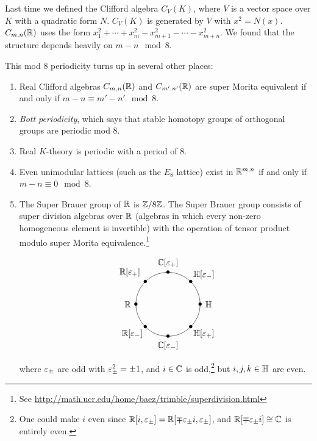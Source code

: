  \setcounter{lecture}{23}

 Last time we defined the Clifford algebra $C_V(K)$, where $V$ is a vector space over $K$
 with a quadratic form $N$. $C_V(K)$ is generated by $V$ with $x^2=N(x)$.
 $C_{m,n}(\mathbb{R})$ uses the form $x_1^2+\cdots + x_m^2-x_{m+1}^2-\cdots - x_{m+n}^2$. We
 found that the structure depends heavily on $m-n \mod 8$.
 \begin{remark}
   This mod 8 periodicity turns up in several other places:
 \begin{enumerate}
 \item Real Clifford algebras $C_{m,n}(\mathbb{R})$ and $C_{m',n'}(\mathbb{R})$ are super Morita
 equivalent if and only if $m-n\equiv m'-n'\mod 8$.

 \item \emph{Bott periodicity}, which says that stable
 homotopy groups of orthogonal groups are periodic mod 8.

 \item Real $K$-theory is periodic with a period of 8.

 \item Even unimodular lattices (such as the $E_8$ lattice) exist in $\mathbb{R}^{m,n}$
 if and only if $m-n\equiv 0\mod 8$.

 \item The Super Brauer group of $\mathbb{R}$ is $\mathbb{Z}/8\mathbb{Z}$. The
 Super Brauer group consists of super division algebras over $\mathbb{R}$ (algebras in which
 every non-zero homogeneous element is invertible) with the operation of tensor product
 modulo super Morita equivalence.\footnote{See
 \url{http://math.ucr.edu/home/baez/trimble/superdivision.html}}
 \[
 \begin{xy}<3.75em,0em>:
   (-1,0) *++!R{\RR} *{\bullet},
   (-\halfroottwo,\halfroottwo) *++!RD{\RR[\e_+]} *{\bullet},
   (0,1) *++!D{\CC[\e_+]} *{\bullet},
   (\halfroottwo,\halfroottwo) *+!LD{\HH[\e_-]} *{\bullet},
   (1,0) *++!L{\HH} *{\bullet},
   (\halfroottwo,-\halfroottwo) *+!LU{\HH[\e_+]} *{\bullet},
   (0,-1) *++!U{\CC[\e_-]} *{\bullet},
   (-\halfroottwo,-\halfroottwo) *+!RU{\RR[\e_-]} *{\bullet},
   (0,0), *\xycircle(1,1){}
 \end{xy}\]
 where $\varepsilon_{\pm}$ are odd with $\varepsilon_\pm^2 = \pm 1$, and $i\in \mathbb{C}$ is odd,\footnote{One
 could make $i$ even since $\mathbb{R}[i,\varepsilon_\pm]=\mathbb{R}[\mp \varepsilon_\pm i, \varepsilon_\pm]$, and $\mathbb{R}[\mp\varepsilon_\pm
 i]\cong \mathbb{C}$ is entirely even.} but $i,j,k\in \mathbb{H}$ are even.
 \end{enumerate}
 \end{remark}
